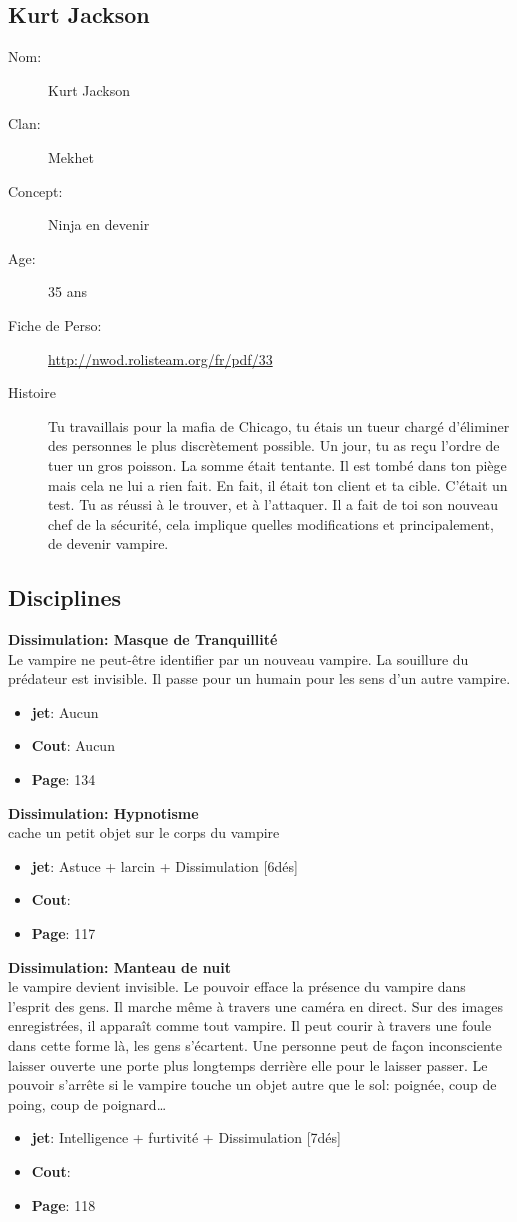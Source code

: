\documentclass[oneside,12pt]{book}
\newcommand\don[5]{
\textbf{#1} \\
#2
\begin{itemize}
\item{ \textbf{jet}: #3}
\item{ \textbf{Cout}: #4}
\item{ \textbf{Page}: #5}
\end{itemize}
\vspace{0.5cm}
}
\begin{document}
\begin{flushleft}
\section{Kurt Jackson}
\begin{description}
\item[Nom:]{Kurt Jackson}
\item[Clan:]{Mekhet}
\item[Concept:]{Ninja en devenir}
\item[Age:]{35 ans}
\item[Fiche de Perso:]{\url{http://nwod.rolisteam.org/fr/pdf/33}}
\item[Histoire]{
Tu travaillais pour la mafia de Chicago, tu étais un tueur chargé d'éliminer des personnes le plus discrètement possible. Un jour, tu as reçu l'ordre de tuer un gros poisson. La somme était tentante. Il est tombé dans ton piège mais cela ne lui a rien fait. En fait, il était ton client et ta cible. C'était un test. Tu as réussi à le trouver, et à l'attaquer. Il a fait de toi son nouveau chef de la sécurité, cela implique quelles modifications et principalement, de devenir vampire.
}
\end{description}

\vspace{0.5cm}
\subsection{Disciplines}
\vspace{0.5cm}
\don{Dissimulation: Masque de Tranquillité}{Le vampire ne peut-être identifier par un nouveau vampire. La souillure du prédateur est invisible. Il passe pour un humain pour les sens d'un autre vampire.}{Aucun}{Aucun}{134 }
\don{Dissimulation: Hypnotisme}{cache un petit objet sur le corps du vampire }{Astuce + larcin + Dissimulation [6dés]}{}{117}
\don{Dissimulation: Manteau de nuit}{le vampire devient invisible. Le pouvoir efface la présence du vampire dans l'esprit des gens. Il marche même à travers une caméra en direct. Sur des images enregistrées, il apparaît comme tout vampire. Il peut courir à travers une foule dans cette forme là, les gens s'écartent. Une personne peut de façon inconsciente laisser ouverte une porte plus longtemps derrière elle pour le laisser passer. Le pouvoir s'arrête si le vampire touche un objet autre que le sol: poignée, coup de poing, coup de poignard… }{Intelligence + furtivité + Dissimulation [7dés]}{}{118}



\clearpage

\end{flushleft}
\end{document}
